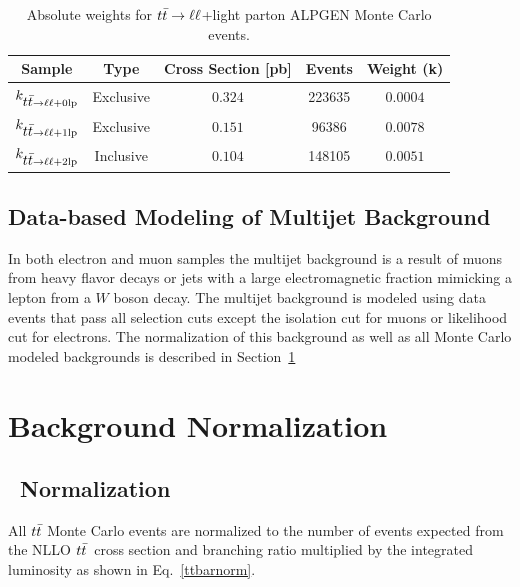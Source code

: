 \begin{table}[!h!tbp]
\begin{center}
\caption{Absolute weights for $\mbox{$t\bar{t}$} \rightarrow \ell \ell$+light parton ALPGEN Monte Carlo events.}
\label{dileptoncross}
\begin{tabular}{c|cccc}
Sample				&	Type		&	Cross Section [pb]	&	Events	&	Weight (k) \\
\hline
$k_{\mbox{$t\bar{t}$} \rightarrow \ell \ell+0\rm{lp}}$	&	Exclusive	&	$0.324$			&	223635	&	$0.0004$			\\
$k_{\mbox{$t\bar{t}$} \rightarrow \ell \ell+1\rm{lp}}$	&	Exclusive	&	$0.151$			&	96386	&	$0.0078$			\\
$k_{\mbox{$t\bar{t}$} \rightarrow \ell \ell+2\rm{lp}}$	&	Inclusive	&	$0.104$			&	148105	&	$0.0051$			\\
\end{tabular}
\vspace{-0.1 in}
\end{center}
\end{table}



\subsection{Data-based Modeling of Multijet Background}

In both electron and muon samples the multijet background is a result of muons from heavy flavor decays or jets with a large electromagnetic fraction mimicking a lepton from a $W$ boson decay. The multijet background is modeled using data events that pass all selection cuts except the isolation cut for muons or likelihood cut for electrons. The normalization of this background as well as all Monte Carlo modeled backgrounds is described in Section~\ref{backgroundnorm}

\section{Background Normalization}
\label{backgroundnorm}

\subsection{\ttbar~Normalization}
\label{ttbarnormmethod}

All $\mbox{$t\bar{t}$}$ Monte Carlo events are normalized to the number of events expected from the NLLO $\mbox{$t\bar{t}$}$~cross section and branching ratio multiplied by the integrated luminosity as shown in Eq.~\ref{ttbarnorm}.

